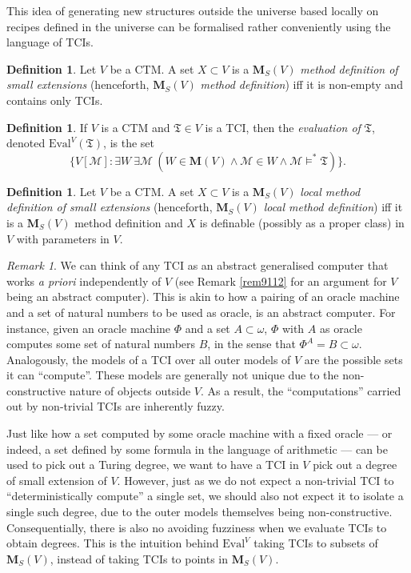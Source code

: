 \documentclass[12pt, twoside]{memoir}
\numberwithin{equation}{section}
\theoremstyle{definition}
\newtheorem{defi}[thm]{Definition}
\theoremstyle{remark}
\newtheorem{rem}[thm]{Remark}
\theoremstyle{definition}
\theoremstyle{definition}
\theoremstyle{definition}
\theoremstyle{remark}
\begin{document}
This idea of generating new structures outside the universe based locally on recipes defined in the universe can be formalised rather conveniently using the language of TCIs. 

\begin{defi}\label{def320}
Let $V$ be a CTM. A set $X \subset V$ is a $\mathbf{M}_S(V)$ \emph{method definition of small extensions} (henceforth, $\mathbf{M}_S(V)$ \emph{method definition}) iff it is non-empty and contains only TCIs.
\end{defi}

\begin{defi}\label{def323}
If $V$ is a CTM and $\mathfrak{T} \in V$ is a TCI, then the \emph{evaluation of} $\mathfrak{T}$, denoted $\mathrm{Eval}^V(\mathfrak{T})$, is the set
\begin{equation*}
    \{V[\mathcal{M}] : \exists W \ \exists \mathcal{M} \ (W \in \mathbf{M}(V) \wedge \mathcal{M} \in W \wedge \mathcal{M} \models^* \mathfrak{T})\} \text{.}
\end{equation*}
\end{defi}

\begin{defi}\label{def923}
Let $V$ be a CTM. A set $X \subset V$ is a $\mathbf{M}_S(V)$ \emph{local method definition of small extensions} (henceforth, $\mathbf{M}_S(V)$ \emph{local method definition}) iff it is a $\mathbf{M}_S(V)$ method definition and $X$ is definable (possibly as a proper class) in $V$ with parameters in $V$. 
\end{defi}

\begin{rem}\label{rem924}
We can think of any TCI as an abstract generalised computer that works \emph{a priori} independently of $V$ (see Remark \ref{rem9112} for an argument for $V$ being an abstract computer). This is akin to how a pairing of an oracle machine and a set of natural numbers to be used as oracle, is an abstract computer. For instance, given an oracle machine $\Phi$ and a set $A \subset \omega$, $\Phi$ with $A$ as oracle computes some set of natural numbers $B$, in the sense that $\Phi^A = B \subset \omega$. Analogously, the models of a TCI over all outer models of $V$ are the possible sets it can ``compute''. These models are generally not unique due to the non-constructive nature of objects outside $V$. As a result, the ``computations'' carried out by non-trivial TCIs are inherently fuzzy.

Just like how a set computed by some oracle machine with a fixed oracle --- or indeed, a set defined by some formula in the language of arithmetic --- can be used to pick out a Turing degree, we want to have a TCI in $V$ pick out a degree of small extension of $V$. However, just as we do not expect a non-trivial TCI to ``deterministically compute'' a single set, we should also not expect it to isolate a single such degree, due to the outer models themselves being non-constructive. Consequentially, there is also no avoiding fuzziness when we evaluate TCIs to obtain degrees. This is the intuition behind $\mathrm{Eval}^V$ taking TCIs to subsets of $\mathbf{M}_S(V)$, instead of taking TCIs to points in $\mathbf{M}_S(V)$.
\end{rem}
\end{document}
